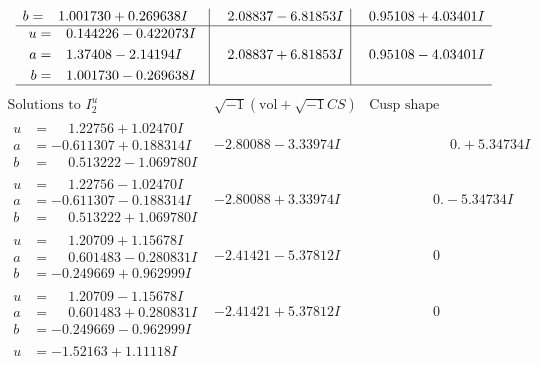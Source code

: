 \documentclass[1p]{elsarticle_modified}
\theoremstyle{definition}
\newcommand{\I}{\sqrt{-1}}
\begin{document}
$$\begin{array}{c|c|c}
\begin{aligned}
b &= \phantom{-}1.001730 + 0.269638 I\end{aligned}
 & \phantom{-}2.08837 - 6.81853 I & \phantom{-}0.95108 + 4.03401 I \\ \hline\begin{aligned}
u &= \phantom{-}0.144226 - 0.422073 I \\
a &= \phantom{-}1.37408 - 2.14194 I \\
b &= \phantom{-}1.001730 - 0.269638 I\end{aligned}
 & \phantom{-}2.08837 + 6.81853 I & \phantom{-}0.95108 - 4.03401 I\\
 \hline 
 \end{array}$$\newpage$$\begin{array}{c|c|c}  
\text{Solutions to }I^u_{2}& \I (\text{vol} + \sqrt{-1}CS) & \text{Cusp shape}\\
 \hline 
\begin{aligned}
u &= \phantom{-}1.22756 + 1.02470 I \\
a &= -0.611307 + 0.188314 I \\
b &= \phantom{-}0.513222 - 1.069780 I\end{aligned}
 & -2.80088 - 3.33974 I & \phantom{-0.000000 -}0. + 5.34734 I \\ \hline\begin{aligned}
u &= \phantom{-}1.22756 - 1.02470 I \\
a &= -0.611307 - 0.188314 I \\
b &= \phantom{-}0.513222 + 1.069780 I\end{aligned}
 & -2.80088 + 3.33974 I & \phantom{-0.000000 } 0. - 5.34734 I \\ \hline\begin{aligned}
u &= \phantom{-}1.20709 + 1.15678 I \\
a &= \phantom{-}0.601483 - 0.280831 I \\
b &= -0.249669 + 0.962999 I\end{aligned}
 & -2.41421 - 5.37812 I & \phantom{-0.000000 } 0 \\ \hline\begin{aligned}
u &= \phantom{-}1.20709 - 1.15678 I \\
a &= \phantom{-}0.601483 + 0.280831 I \\
b &= -0.249669 - 0.962999 I\end{aligned}
 & -2.41421 + 5.37812 I & \phantom{-0.000000 } 0 \\ \hline\begin{aligned}
u &= -1.52163 + 1.11118 I \\

\end{aligned}
\end{array}$$
\end{document}
